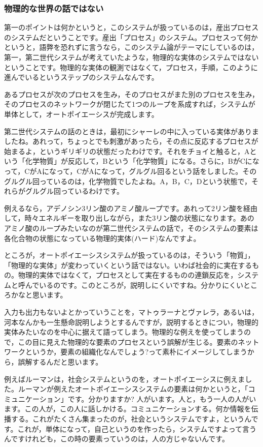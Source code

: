 \documentclass{ltjsbook}
\begin{document}
\subsubsection{物理的な世界の話ではない}

第一のポイントは何かというと，このシステムが扱っているのは，産出プロセスのシステムだということです。産出「プロセス」のシステム。プロセスって何かというと，語弊を恐れずに言うなら，このシステム論がテーマにしているのは，第一，第二世代システムが考えていたような，物理的な実体のシステムではないということです。物理的な実体の観測ではなくて，プロセス，手順，このように進んでいるというステップのシステムなんです。

あるプロセスが次のプロセスを生み，そのプロセスがまた別のプロセスを生み，そのプロセスのネットワークが閉じたて1つのループを系成すれば，システムが単体として，オートポイエーシスが完成します。

第二世代システムの話のときは，最初にシャーレの中に入っている実体がありましたね。あれって，ちょっとでも刺激があったら，その点に反応するプロセスが始まるよ，というギリギリの状態だったわけです。それをチョイと触ると，Aという「化学物質」が反応して，Bという「化学物質」になる。さらに，BがCになって，CがAになって，CがAになって，グルグル回るという話をしました。そのグルグル回っているのは，化学物質でしたよね。A，B，C，Dという状態で，それらがグルグル回っているわけです。

例えるなら，アデノシン3リン酸のアミノ酸ループです。あれって2リン酸を経由して，時々エネルギーを取り出しながら，また3リン酸の状態になります。あのアミノ酸のループみたいなのが第二世代システムの話で，そのシステムの要素は各化合物の状態になっている物理的実体(ハード)なんですよ。

ところが，オートポイエーシスシステムが扱っているのは，そういう「物質」，「物理的な実体」が変わっていくという話ではない。いわば社会的に実在するもの。物理的実体ではなくて，プロセスとして実在するものの連鎖反応を，システムと呼んでいるのです。このところが，説明しにくいですね。分かりにくいところかなと思います。

入力も出力もないよとかっていうことを，マトゥラーナとヴァレラ，あるいは，河本なんかも一生懸命説明しようとするんですが，説明するときについ，物理的実体みたいなのを中心に据えて語ってしまう。物理的な例えを使ってしまうので，この目に見えた物理的な要素のプロセスという誤解が生じる。要素のネットワークというか，要素の組織化なんでしょう?って素朴にイメージしてしまうから，誤解するんだと思います。

例えばルーマンは，社会システムというのを，オートポイエーシスに例えました。ルーマンが例えたオートポイエーシスシステムの要素は何かというと，「コミュニケーション」です。分かりますか? 人がいます。人と，もう一人の人がいます。この人が，この人に話しかける。コミュニケーションする。何か情報を伝播する。これがたくさん集まったのが，社会というシステムですよ，というんです。これが，単体になって，自己というのを作ったら，システムですよって言うんですけれども，この時の要素っていうのは，人の方じゃないんです。
\end{document}

